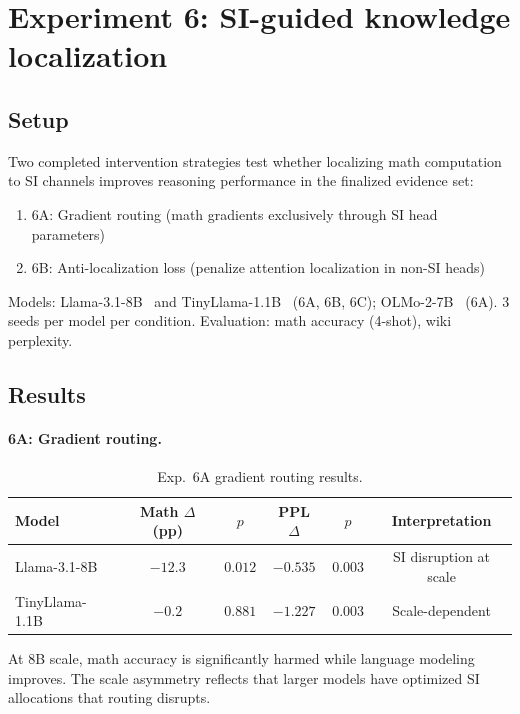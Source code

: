 \documentclass{article}
\begin{document}
\section{Experiment 6: SI-guided knowledge localization}
\label{app:exp6}

\subsection{Setup}

Two completed intervention strategies test whether localizing math computation to SI channels
improves reasoning performance in the finalized evidence set:
\begin{enumerate}
\item 6A: Gradient routing (math gradients exclusively through SI head parameters)
\item 6B: Anti-localization loss (penalize attention localization in non-SI heads)
\end{enumerate}

Models: Llama-3.1-8B~\citep{dubey2024llama3} and TinyLlama-1.1B~\citep{zhang2024tinyllama}
(6A, 6B, 6C); OLMo-2-7B~\citep{groeneveld2024olmo} (6A). 3 seeds per model per condition.
Evaluation: math accuracy (4-shot), wiki perplexity.

\subsection{Results}

\paragraph{6A: Gradient routing.}
\begin{table}[htbp]
    \caption{Exp.~6A gradient routing results.}
    \centering
    \small
    \begin{tabular}{lccccc}
        \toprule
        Model & Math $\Delta$ (pp) & $p$ & PPL $\Delta$ & $p$ & Interpretation \\
        \midrule
        Llama-3.1-8B & $-12.3$ & $0.012$ & $-0.535$ & $0.003$ & SI disruption at scale \\
        TinyLlama-1.1B & $-0.2$ & $0.881$ & $-1.227$ & $0.003$ & Scale-dependent \\
        \bottomrule
    \end{tabular}
\end{table}

At 8B scale, math accuracy is significantly harmed while language modeling improves. The
scale asymmetry reflects that larger models have optimized SI allocations that routing disrupts.
\end{document}
